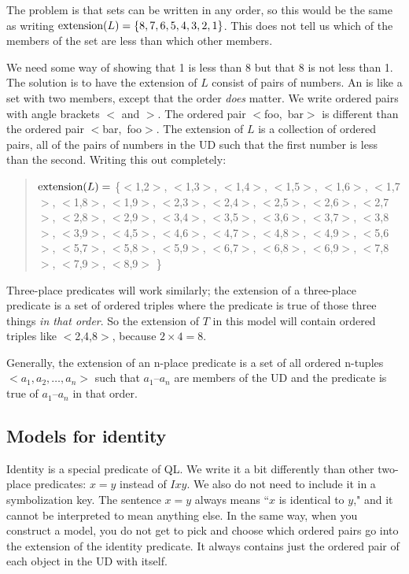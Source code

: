 The problem is that sets can be written in any order, so this would be the same as writing $\mbox{extension}(L)=\{8,7,6,5,4,3,2,1\}$. This does not tell us which of the members of the set are less than which other members.

We need some way of showing that 1 is less than 8 but that 8 is not less than 1. The solution is to have the extension of $L$ consist of pairs of numbers. An  is like a set with two members, except that the order \emph{does} matter. We write ordered pairs with angle brackets $<$ and $>$. The ordered pair \mbox{$<$foo, bar$>$} is different than the ordered pair \mbox{$<$bar, foo$>$}. The extension of $L$ is a collection of ordered pairs, all of the pairs of numbers in the UD such that the first number is less than the second. Writing this out completely:
\begin{quote}
$\mbox{extension}(L)=$ \{$<$1,2$>$, $<$1,3$>$, $<$1,4$>$, $<$1,5$>$, $<$1,6$>$, $<$1,7$>$, $<$1,8$>$, $<$1,9$>$,
$<$2,3$>$, $<$2,4$>$, $<$2,5$>$, $<$2,6$>$, $<$2,7$>$, $<$2,8$>$, $<$2,9$>$,
$<$3,4$>$, $<$3,5$>$, $<$3,6$>$, $<$3,7$>$, $<$3,8$>$, $<$3,9$>$,
$<$4,5$>$, $<$4,6$>$, $<$4,7$>$, $<$4,8$>$, $<$4,9$>$,
$<$5,6$>$, $<$5,7$>$, $<$5,8$>$, $<$5,9$>$,
$<$6,7$>$, $<$6,8$>$, $<$6,9$>$,
$<$7,8$>$, $<$7,9$>$,
$<$8,9$>$%
\}
\end{quote}

Three-place predicates will work similarly; the extension of a three-place predicate is a set of ordered triples where the predicate is true of those three things \emph{in that order}. So the extension of $T$ in this model will contain ordered triples like $<$2,4,8$>$, because $2\times 4 = 8$.

Generally, the extension of an n-place predicate is a set of all ordered n-tuples ${<}a_1, a_2,\ldots, a_n{>}$ such that $a_1$--$a_n$ are members of the UD and the predicate is true of $a_1$--$a_n$ in that order.


\subsection{Models for identity}
Identity is a special predicate of QL. We write it a bit differently than other two-place predicates: $x=y$ instead of $Ixy$. We also do not need to include it in a symbolization key. The sentence $x=y$ always means ``$x$ is identical to $y$,"  and it cannot be interpreted to mean anything else. In the same way, when you construct a model, you do not get to pick and choose which ordered pairs go into the extension of the identity predicate. It always contains just the ordered pair of each object in the UD with itself.

